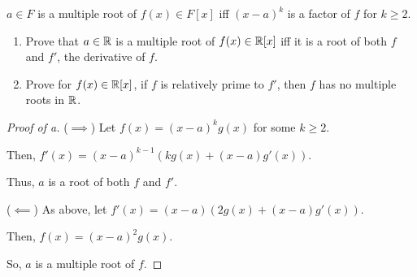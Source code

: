 \documentclass[../hw5]{subfiles}
\begin{document}
\begin{problem}
$a\in F$ is a multiple root of $f(x)\in F[x]$ iff $(x-a)^k$ is a factor of  $f$ for  $k \ge 2$.
\begin{enumerate}[label=\alph*)]
	\item Prove that $a\in \mathbb{R}$ is a multiple root of $f(x)\in \mathbb{R}[x]$ iff it is a root of both $f$ and  $f'$,  the derivative of $f$.
	\item  Prove for $f(x)\in \mathbb{R}[x]$, if $f$ is relatively prime to  $f'$, then  $f$ has no multiple roots in  $\mathbb{R}$.
\end{enumerate}
\end{problem}
\begin{proof}[Proof of a] ($\implies$)
	Let $f(x)=(x-a)^k g(x)$ for some  $k\ge 2$.

	Then, $f'(x)=(x-a)^{k-1}(kg(x)+(x-a)g'(x))$.

	Thus, $a$ is a root of both $f$ and  $f'$.

	($\impliedby$)
	As above, let $f'(x)=(x-a)(2g(x)+(x-a)g'(x))$.

	Then, $f(x)=(x-a)^2g(x)$.

	So, $a$ is a multiple root of  $f$.
\end{proof}
\end{document}
